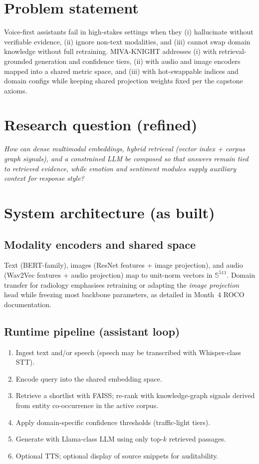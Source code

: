 \documentclass[12pt,a4paper]{article}
\begin{document}
\section{Problem statement}

Voice-first assistants fail in high-stakes settings when they (i) hallucinate without
verifiable evidence, (ii) ignore non-text modalities, and (iii) cannot swap domain
knowledge without full retraining. MIVA-KNIGHT addresses (i) with retrieval-grounded
generation and confidence tiers, (ii) with audio and image encoders mapped into a
shared metric space, and (iii) with hot-swappable indices and domain configs while
keeping shared projection weights fixed per the capstone axioms.

\section{Research question (refined)}

\emph{How can dense multimodal embeddings, hybrid retrieval (vector index + corpus
graph signals), and a constrained LLM be composed so that answers remain tied to
retrieved evidence, while emotion and sentiment modules supply auxiliary context for
response style?}

\section{System architecture (as built)}

\subsection{Modality encoders and shared space}
Text (BERT-family), images (ResNet features + image projection), and audio (Wav2Vec
features + audio projection) map to unit-norm vectors in $\mathbb{S}^{511}$.
Domain transfer for radiology emphasises retraining or adapting the \emph{image
projection} head while freezing most backbone parameters, as detailed in Month~4 ROCO
documentation.

\subsection{Runtime pipeline (assistant loop)}
\begin{enumerate}[label=\textbf{Step \arabic*.}]
  \item Ingest text and/or speech (speech may be transcribed with Whisper-class STT).
  \item Encode query into the shared embedding space.
  \item Retrieve a shortlist with FAISS; re-rank with knowledge-graph signals derived
        from entity co-occurrence in the active corpus.
  \item Apply domain-specific confidence thresholds (traffic-light tiers).
  \item Generate with Llama-class LLM using only top-$k$ retrieved passages.
  \item Optional TTS; optional display of source snippets for auditability.
\end{enumerate}
\end{document}
